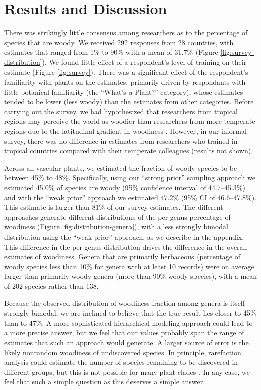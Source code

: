 \documentclass[12pt]{article}
\begin{document}
\section{Results and Discussion}

There was strikingly little consensus among researchers as to the
percentage of species that are woody.  We received 292 responses from
28 countries, with estimates that ranged from 1\% to 90\% with a mean
of 31.7\% (Figure \ref{fig:survey-distribution}).
We found little effect of a respondent's level of training on their
estimate (Figure \ref{fig:survey}).  There was a significant effect of
the respondent's familiarity with plants on the estimates, primarily
driven by respondants with little botanical familiarity (the ``What's
a Plant?'' category), whose estimates tended to be lower (less
woody) than the estimates from other categories.
%
Before carrying out the survey, we had hypothesized that researchers
from tropical regions may perceive the world as woodier than
researchers from more temperate regions due to the latitudinal
gradient in woodiness \citep{Molesheihgt}.
%
However, in our informal survey, there was no difference in estimates
from researchers who trained in tropical countries compared with their
temperate colleagues (results not shown).

Across all vascular plants, we estimated the fraction of woody species
to be between 45\% to 48\%.
Specifically, using our ``strong prior'' sampling approach we
estimated 45.0\% of species are woody (95\% confidence interval of
44.7--45.3\%) and with the ``weak prior'' approach we estimated 47.2\%
(95\% CI of 46.6--47.8\%).  This estimate is larger than 81\% of our
survey estimates.
The different approaches generate different distributions of the
per-genus percentage of woodiness (Figure
\ref{fig:distribution-genera}), with a less strongly bimodal
distribution using the ``weak prior'' approach, as we describe in the
appendix.
%
This difference in the per-genus distribution drives the difference in
the overall estimates of woodiness.  Genera that are primarily
herbaceous (percentage of woody species less than 10\% for genera with
at least 10 records) were on average larger than primarily woody
genera (more than 90\% woody species), with a mean of 202 species
rather than 138.

Because the observed distribution of woodiness fraction among genera
is itself strongly bimodal, we are inclined to believe that the true
result lies closer to 45\% than to 47\%.  A more sophisticated
hierarchical modeling approach could lead to a more precise answer,
but we feel that our values probably span the range of estimates that
such an approach would generate.
%
A larger source of error is the likely nonrandom woodiness of
undiscovered species.  In principle, rarefaction analysis could
estimate the number of species remaining to be discovered in different
groups, but this is not possible for many plant clades
\citep{costello2011}.
%
In any case, we feel that such a simple question as this deserves a
simple answer.
\end{document}
